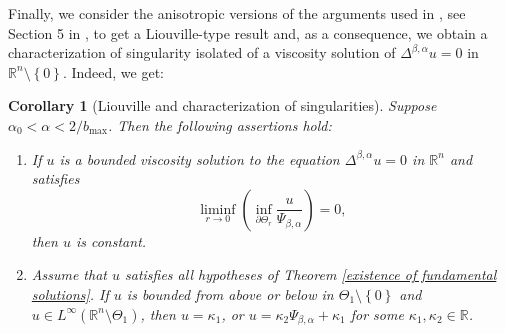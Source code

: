 \documentclass[10pt, leqno]{article}
\newtheorem{corollary}[theorem]{Corollary}
\theoremstyle{definition}
\theoremstyle{remark}
\numberwithin{equation}{section}
\begin{document}
Finally, we consider the anisotropic versions of the arguments used in \cite{CWW}, see Section 5 in \cite{CWW}, to get a Liouville-type result and, as a consequence, we obtain a characterization of singularity isolated of a viscosity solution of $\Delta^{\beta, \alpha} u = 0$ in $\mathbb{R}^{n} \setminus \left\lbrace 0 \right\rbrace$. Indeed, we get:
\begin{corollary}[Liouville and characterization of singularities] Suppose $ \alpha_{0} < \alpha < 2/b_{\max}$. Then the following assertions hold:
\begin{enumerate}
\item If $u$ is a bounded viscosity solution to the equation $\Delta^{\beta, \alpha}u = 0$ in $\mathbb{R}^{n}$ and satisfies
$$
\displaystyle \liminf_{r \rightarrow 0} \left( \inf_{\partial \Theta_{r}}\dfrac{u}{\Psi_{\beta, \alpha}} \right) = 0,
$$
then $u$ is constant.
\item Assume that $u$ satisfies all hypotheses of Theorem \ref{existence of fundamental solutions}. If $u$ is  bounded from above or below in $\Theta_{1} \setminus \left\lbrace 0 \right\rbrace $ and $u \in L^{\infty}\left( \mathbb{R}^{n} \setminus \Theta_{1} \right)$, then $u = \kappa_{1}$, or $u = \kappa_{2} \Psi_{\beta, \alpha} + \kappa_{1}$ for some $\kappa_{1}, \kappa_{2} \in \mathbb{R}$.
\end{enumerate}

\end{corollary}


\end{document}
